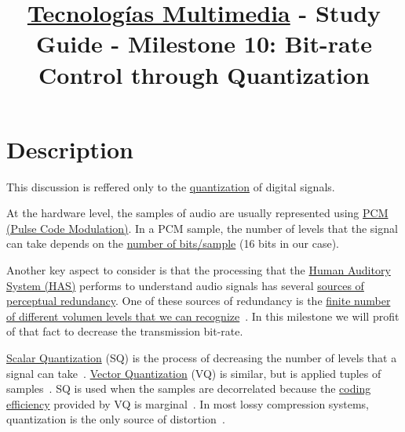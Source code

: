 \title{\href{https://www.ual.es/estudios/grados/presentacion/plandeestudios/asignatura/4015/40154321?idioma=zh_CN}{Tecnologías Multimedia} - Study Guide - Milestone 10: Bit-rate Control through Quantization}

\maketitle

\section{Description}

This discussion is reffered only to the
\href{https://en.wikipedia.org/wiki/Quantization_(signal_processing)}{quantization}
of digital signals.

At the hardware level, the samples of audio are usually represented
using \href{https://en.wikipedia.org/wiki/Pulse-code_modulation}{PCM
  (Pulse Code Modulation)}. In a PCM sample, the number of levels that
the signal can take depends on the
\href{https://en.wikipedia.org/wiki/Audio_bit_depth}{number of
  bits/sample} (16 bits in our case).

Another key aspect to consider is that the processing that the
\href{https://en.wikipedia.org/wiki/Auditory_system}{Human Auditory
  System (HAS)} performs to understand audio signals has several
\href{https://en.wikipedia.org/wiki/Psychoacoustics}{sources of
  perceptual redundancy}. One of these sources of redundancy is the
\href{https://en.wikipedia.org/wiki/Equal-loudness_contour}{finite
  number of different volumen levels that we can
  recognize}~\cite{bosi2003intro}. In this milestone we will profit of
that fact to decrease the transmission bit-rate.

\href{https://en.wikipedia.org/wiki/Quantization_(signal_processing}{Scalar
  Quantization} (SQ) is the process of decreasing the number of levels
that a signal can
take~\cite{sayood2017introduction}. \href{https://en.wikipedia.org/wiki/Vector_quantization}{Vector
  Quantization} (VQ) is similar, but is applied tuples of
samples~\cite{vetterli2014foundations}. SQ is used when the
samples are decorrelated because the
\href{https://en.wikipedia.org/wiki/Quantization_(signal_processing)#Rate%E2%80%93distortion_optimization}{coding
  efficiency} provided by VQ is
marginal~\cite{vetterli2014foundations}. In most lossy compression
systems, quantization is the only source of
distortion~\cite{taubman2012jpeg2000}.

